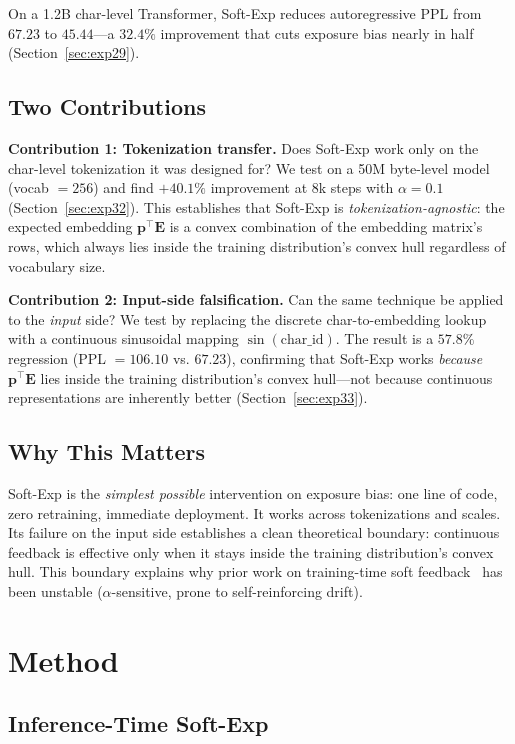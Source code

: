 \documentclass[11pt]{article}
\begin{document}
On a 1.2B char-level Transformer, Soft-Exp reduces autoregressive PPL from $67.23$ to $45.44$—a $32.4\%$ improvement that cuts exposure bias nearly in half (Section~\ref{sec:exp29}).

\subsection{Two Contributions}

\textbf{Contribution 1: Tokenization transfer.} Does Soft-Exp work only on the char-level tokenization it was designed for? We test on a 50M byte-level model (vocab $= 256$) and find $+40.1\%$ improvement at 8k steps with $\alpha=0.1$ (Section~\ref{sec:exp32}). This establishes that Soft-Exp is \emph{tokenization-agnostic}: the expected embedding $\mathbf{p}^\top \mathbf{E}$ is a convex combination of the embedding matrix's rows, which always lies inside the training distribution's convex hull regardless of vocabulary size.

\textbf{Contribution 2: Input-side falsification.} Can the same technique be applied to the \emph{input} side? We test by replacing the discrete char-to-embedding lookup with a continuous sinusoidal mapping $\sin(\text{char\_id})$. The result is a $57.8\%$ regression (PPL $= 106.10$ vs. $67.23$), confirming that Soft-Exp works \emph{because} $\mathbf{p}^\top \mathbf{E}$ lies inside the training distribution's convex hull—not because continuous representations are inherently better (Section~\ref{sec:exp33}).

\subsection{Why This Matters}

Soft-Exp is the \emph{simplest possible} intervention on exposure bias: one line of code, zero retraining, immediate deployment. It works across tokenizations and scales. Its failure on the input side establishes a clean theoretical boundary: continuous feedback is effective only when it stays inside the training distribution's convex hull. This boundary explains why prior work on training-time soft feedback~\cite{exp30} has been unstable ($\alpha$-sensitive, prone to self-reinforcing drift).

\section{Method}
\label{sec:method}

\subsection{Inference-Time Soft-Exp}
\label{sec:method_inference}
\end{document}
